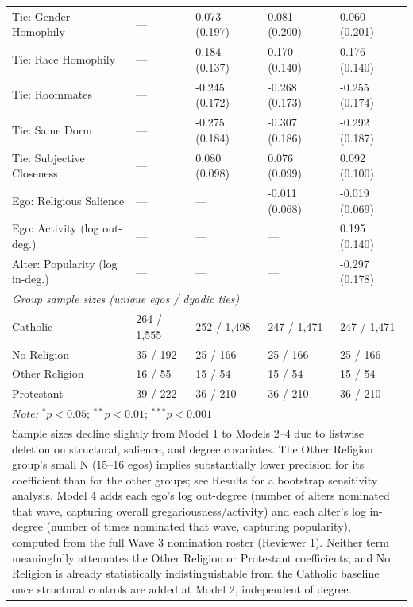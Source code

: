 \begin{table}[htbp]
{\begin{tabular}[t]{lllll}
Tie: Gender Homophily & --- & 0.073 (0.197) & 0.081 (0.200) & 0.060 (0.201)\\
Tie: Race Homophily & --- & 0.184 (0.137) & 0.170 (0.140) & 0.176 (0.140)\\
Tie: Roommates & --- & -0.245 (0.172) & -0.268 (0.173) & -0.255 (0.174)\\
Tie: Same Dorm & --- & -0.275 (0.184) & -0.307 (0.186) & -0.292 (0.187)\\
Tie: Subjective Closeness & --- & 0.080 (0.098) & 0.076 (0.099) & 0.092 (0.100)\\
Ego: Religious Salience & --- & --- & -0.011 (0.068) & -0.019 (0.069)\\
Ego: Activity (log out-deg.) & --- & --- & --- & 0.195 (0.140)\\
Alter: Popularity (log in-deg.) & --- & --- & --- & -0.297 (0.178)\\
\midrule
\multicolumn{5}{l}{\textit{Group sample sizes (unique egos / dyadic ties)}}\\
Catholic & 264 / 1,555 & 252 / 1,498 & 247 / 1,471 & 247 / 1,471\\
No Religion & 35 / 192 & 25 / 166 & 25 / 166 & 25 / 166\\
Other Religion & 16 / 55 & 15 / 54 & 15 / 54 & 15 / 54\\
Protestant & 39 / 222 & 36 / 210 & 36 / 210 & 36 / 210\\
\bottomrule
\multicolumn{5}{l}{\rule{0pt}{1em}\textit{Note:} $^{*} p < 0.05$; $^{**} p < 0.01$; $^{***} p < 0.001$}\\
\multicolumn{5}{p{0.98\textwidth}}{\footnotesize Sample sizes decline slightly from Model 1 to Models 2--4 due to listwise deletion on structural, salience, and degree covariates. The Other Religion group's small N (15--16 egos) implies substantially lower precision for its coefficient than for the other groups; see Results for a bootstrap sensitivity analysis. Model 4 adds each ego's log out-degree (number of alters nominated that wave, capturing overall gregariousness/activity) and each alter's log in-degree (number of times nominated that wave, capturing popularity), computed from the full Wave 3 nomination roster (Reviewer 1). Neither term meaningfully attenuates the Other Religion or Protestant coefficients, and No Religion is already statistically indistinguishable from the Catholic baseline once structural controls are added at Model 2, independent of degree.}\\
\end{tabular}
}
\end{table}
